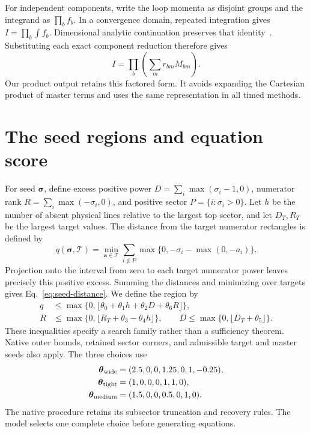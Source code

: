 For independent components, write the loop momenta as disjoint groups and the integrand as $\prod_b f_b$. In a convergence domain, repeated integration gives $I=\prod_b\int f_b$. Dimensional analytic continuation preserves that identity~\cite{Weinzierl2022}. Substituting each exact component reduction therefore gives
\begin{equation}
 I=\prod_b\left(\sum_m r_{bm}M_{bm}\right).
 \label{eq:product-reduction}
\end{equation}
Our product output retains this factored form. It avoids expanding the Cartesian product of master terms and uses the same representation in all timed methods.

\section{The seed regions and equation score}
\label{app:sparse}
For seed $\boldsymbol\sigma$, define excess positive power $D=\sum_i\max(\sigma_i-1,0)$, numerator rank $R=\sum_i\max(-\sigma_i,0)$, and positive sector $P=\{i:\sigma_i>0\}$. Let $h$ be the number of absent physical lines relative to the largest top sector, and let $D_T,R_T$ be the largest target values. The distance from the target numerator rectangles is defined by
\begin{equation}
 q(\boldsymbol\sigma,\mathcal T)=\min_{\boldsymbol a\in\mathcal T}
 \sum_{i\notin P}\max\{0,-\sigma_i-\max(0,-a_i)\}.
 \label{eq:seed-distance}
\end{equation}
Projection onto the interval from zero to each target numerator power leaves precisely this positive excess. Summing the distances and minimizing over targets gives Eq.~\eqref{eq:seed-distance}. We define the region by
\begin{align}
 q&\leq\max\{0,\lfloor\theta_0+\theta_1h+\theta_2D+\theta_6R\rfloor\},\nonumber\\
 R&\leq\max\{0,\lfloor R_T+\theta_3-\theta_4h\rfloor\},\qquad
 D\leq\max\{0,\lfloor D_T+\theta_5\rfloor\}.
 \label{eq:seed-regions}
\end{align}
These inequalities specify a search family rather than a sufficiency theorem. Native outer bounds, retained sector corners, and admissible target and master seeds also apply. The three choices use
\begin{align}
 \boldsymbol\theta_{\rm wide}&=(2.5,0,0,1.25,0,1,-0.25),\nonumber\\
 \boldsymbol\theta_{\rm tight}&=(1,0,0,0,1,1,0),\nonumber\\
 \boldsymbol\theta_{\rm medium}&=(1.5,0,0,0.5,0,1,0).
 \label{eq:seed-values}
\end{align}
The native procedure retains its subsector truncation and recovery rules. The model selects one complete choice before generating equations.

